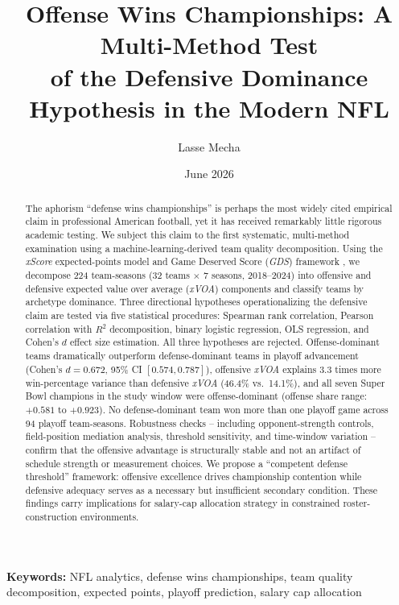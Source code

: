 \documentclass[12pt,a4paper]{article}
\title{Offense Wins Championships: A Multi-Method Test\\of the Defensive Dominance Hypothesis in the Modern NFL}
\author{Lasse Mecha}
\date{June 2026}
\newcommand{\xscore}{\textit{xScore}}
\newcommand{\xvoa}{\textit{xVOA}}
\newcommand{\gds}{\textit{GDS}}
\begin{document}
\maketitle

\begin{abstract}
The aphorism ``defense wins championships'' is perhaps the most widely cited empirical claim in professional American football, yet it has received remarkably little rigorous academic testing. We subject this claim to the first systematic, multi-method examination using a machine-learning-derived team quality decomposition. Using the \xscore{} expected-points model and Game Deserved Score (\gds{}) framework \citep{mecha2026xscore-model, mecha2026gds}, we decompose 224 team-seasons (32 teams $\times$ 7 seasons, 2018--2024) into offensive and defensive expected value over average (\xvoa{}) components and classify teams by archetype dominance. Three directional hypotheses operationalizing the defensive claim are tested via five statistical procedures: Spearman rank correlation, Pearson correlation with $R^2$ decomposition, binary logistic regression, OLS regression, and Cohen's $d$ effect size estimation. All three hypotheses are rejected. Offense-dominant teams dramatically outperform defense-dominant teams in playoff advancement (Cohen's $d = 0.672$, 95\% CI $[0.574, 0.787]$), offensive \xvoa{} explains 3.3 times more win-percentage variance than defensive \xvoa{} (46.4\% vs.\ 14.1\%), and all seven Super Bowl champions in the study window were offense-dominant (offense share range: $+0.581$ to $+0.923$). No defense-dominant team won more than one playoff game across 94 playoff team-seasons. Robustness checks -- including opponent-strength controls, field-position mediation analysis, threshold sensitivity, and time-window variation -- confirm that the offensive advantage is structurally stable and not an artifact of schedule strength or measurement choices. We propose a ``competent defense threshold'' framework: offensive excellence drives championship contention while defensive adequacy serves as a necessary but insufficient secondary condition. These findings carry implications for salary-cap allocation strategy in constrained roster-construction environments.
\end{abstract}

\textbf{Keywords:} NFL analytics, defense wins championships, team quality decomposition, expected points, playoff prediction, salary cap allocation
\end{document}
